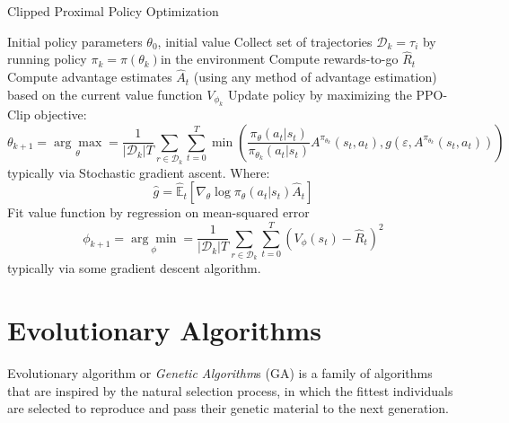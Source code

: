 \begin{algorithm}[H]
    \caption{Clipped Proximal Policy Optimization}
    \label{alg:ppo}
    \begin{algorithmic}[1]
        \Require Initial policy parameters $\theta _0$, initial value
        \State Collect set of trajectories $\mathcal{D} _k = \tau _i$ by running policy $\pi _k = \pi(\theta _k)$in the environment
        \State Compute rewards-to-go $\hat{R} _t$
        \State Compute advantage estimates $\hat{A} _t$
        (using any method of advantage estimation) based on the current value function $V _{\phi _k}$
        \State Update policy by maximizing the PPO-Clip objective:
        $$
            \theta _{k + 1} = \underset{\theta}{\arg\max} = \frac{1}{|\mathcal{D} _k|T} \sum _{r \in \mathcal{D} _k} \sum _{t = 0} ^{T} \min \left( \frac{\pi _{\theta} (a _t | s _t)}{\pi _{\theta_k} (a _t | s _t)} A ^{\pi _{\theta_k}} (s _t, a _t), g(\varepsilon, A ^{\pi _{\theta_k}}(s _t, a _t)) \right)
        $$
        typically via Stochastic gradient ascent. Where:
        $$
            \hat{g} = \hat{\mathbb{E}} _t \left[\nabla _{\theta}\log\pi _{\theta}(a _t | s _t) \hat{A} _t\right]
        $$
        \State Fit value function by regression on mean-squared error
        $$
            \phi _{k + 1} = \underset{\phi}{\arg\min} = \frac{1}{|\mathcal{D} _k|T} \sum _{r \in \mathcal{D} _k} \sum _{t = 0} ^{T} \left(V _{\phi}(s _t) - \hat{R} _t \right)^2
        $$
        typically via some gradient descent algorithm.
        \EndFor
    \end{algorithmic}
\end{algorithm}

\section{Evolutionary Algorithms}

Evolutionary algorithm or \textit{Genetic Algorithm}s (\ac{GA}) is a family of algorithms that are inspired by the natural selection
process, in which the fittest individuals are selected to reproduce and pass their genetic
material to the next generation.
